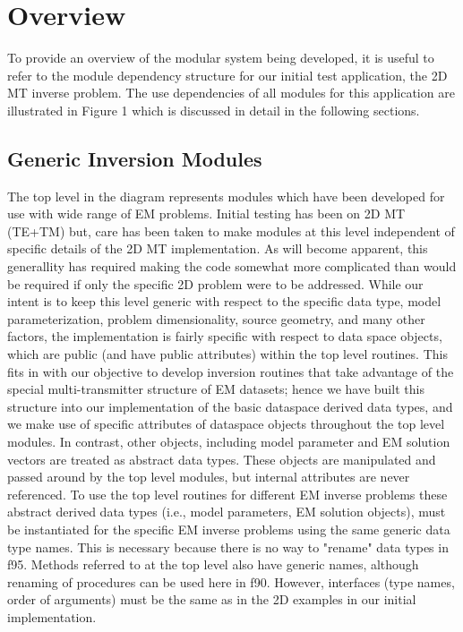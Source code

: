 \documentclass[12pt]{article}
\begin{document}
\section{Overview}

To provide an overview of the modular system being developed,
it is useful to refer to the
module dependency structure for our initial test application,
the 2D MT inverse problem.  The use dependencies of all modules
for this application are illustrated in Figure 1
which is discussed in detail in the following sections.

\subsection{Generic Inversion Modules}
The top level in the diagram represents modules which have
been developed for use with wide range of EM problems.  
Initial testing has been on 2D MT (TE+TM) but, care has been
taken to make modules at this level independent of specific
details of the 2D MT implementation.  As will become apparent,
this generallity has required making the code somewhat more
complicated than would be required if only the specific 2D problem
were to be addressed.  While our intent is to keep this level
generic with respect to the specific data type, model parameterization,
problem dimensionality, source geometry, and many other factors,
the implementation is fairly specific with respect to data 
space objects, which are public (and have public attributes)
within the top level routines.  This fits in with our
objective to develop inversion routines that take advantage of
the special multi-transmitter structure of EM datasets; hence
we have built this structure into our implementation of the basic
dataspace derived data types, and we make use of specific attributes
of dataspace objects throughout the top level modules.  
In contrast, other objects, including model parameter and EM 
solution vectors are treated as abstract data
types.  These objects are manipulated and passed around by the
top level modules, but internal attributes are never referenced.
To use the top level routines for different EM inverse problems
these abstract derived data types (i.e., model parameters, EM solution
objects), must be instantiated for the specific EM inverse problems
using the same generic data type names.  This is necessary because 
there is no way to "rename" data types in f95.  Methods referred 
to at the top level also have generic names, although renaming 
of procedures can be used here in f90.  However, interfaces
(type names, order of arguments) must be the same as in the 2D
examples in our initial implementation.  
\end{document}
